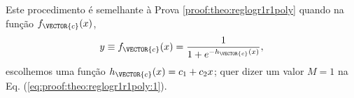 
\begin{myproofT}\label{proof:theo:reglogr1r1}
Este procedimento é semelhante à Prova \ref{proof:theo:reglogr1r1poly} quando
na função $f_{\VECTOR{c}}(x)$,
\begin{equation}
y\equiv f_{\VECTOR{c}}(x)= \frac{1}{1+e^{-h_{\VECTOR{c}}(x) }},
\end{equation}
escolhemos uma função $h_{\VECTOR{c}}(x)= c_1 +c_2 x$;
quer dizer um valor $M=1$ na Eq. (\ref{eq:proof:theo:reglogr1r1poly:1}).
\end{myproofT}


